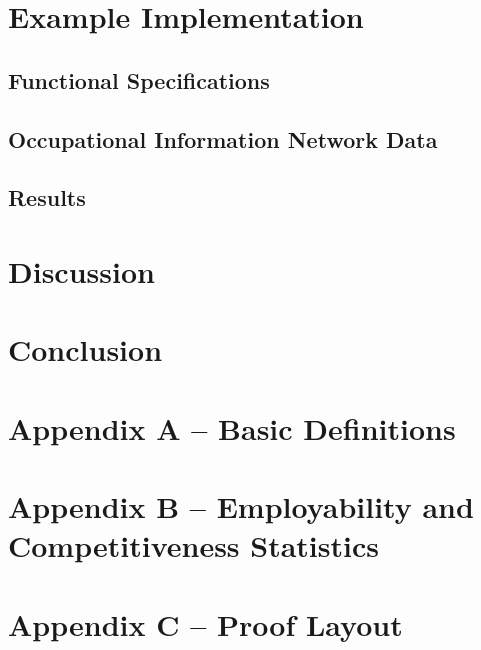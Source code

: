 \documentclass[hidelinks, nonatbib]{elsarticle}
\begin{document}
\section{Example Implementation}
\subsection{Functional Specifications}
\subsection{Occupational Information Network Data}
\subsection{Results}


\section{Discussion}


\section{Conclusion}


\newpage
\printbibliography[
    heading=bibintoc,
    title={References}
]


\newpage
\section*{Appendix A -- Basic Definitions}

\section*{Appendix B -- Employability and Competitiveness Statistics}

\section*{Appendix C -- Proof Layout}

\end{document}
